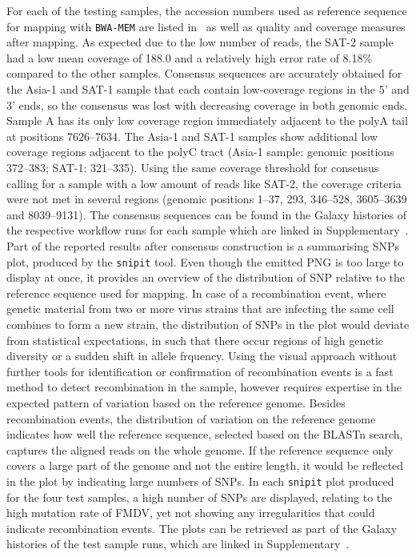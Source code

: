 For each of the testing samples, the accession numbers used as reference sequence for mapping with \texttt{BWA-MEM} are listed in~ as well as quality and coverage measures after mapping. As expected due to the low number of reads, the SAT-2 sample had a low mean coverage of {188.0\texttimes } and a relatively high error rate of 8.18\% compared to the other samples. Consensus sequences are accurately obtained for the Asia-1 and SAT-1 sample that each contain low-coverage regions in the 5' and 3' ends, so the consensus was lost with decreasing coverage in both genomic ends. Sample A has its only low coverage region immediately adjacent to the polyA tail at positions 7626--7634. The Asia-1 and SAT-1 samples show additional low coverage regions adjacent to the polyC tract (Asia-1 sample: genomic positions 372--383; SAT-1: 321--335). Using the same coverage threshold for consensus calling for a sample with a low amount of reads like SAT-2, the coverage criteria were not met in several regions (genomic positions 1--37, 293, 346--528, 3605--3639 and 8039--9131). The consensus sequences can be found in the Galaxy histories of the respective workflow runs for each sample which are linked in Supplementary~. \\
Part of the reported results after consensus construction is a summarising \acp{SNP} plot, produced by the \texttt{snipit} tool. Even though the emitted PNG is too large to display at once, it provides an overview of the distribution of \acs{SNP} relative to the reference sequence used for mapping. In case of a recombination event, where genetic material from two or more virus strains that are infecting the same cell combines to form a new strain, the distribution of \acp{SNP} in the plot would deviate from statistical expectations, in such that there occur regions of high genetic diversity or a sudden shift in allele frquency. Using the visual approach without further tools for identification or confirmation of recombination events is a fast method to detect recombination in the sample, however requires expertise in the expected pattern of variation based on the reference genome. Besides recombination events, the distribution of variation on the reference genome indicates how well the reference sequence, selected based on the \ac{BLAST}n search, captures the aligned reads on the whole genome. If the reference sequence only covers a large part of the genome and not the entire length, it would be reflected in the plot by indicating large numbers of \acp{SNP}. In each \texttt{snipit} plot produced for the four test samples, a high number of \acp{SNP} are displayed, relating to the high mutation rate of \ac{FMDV}, yet not showing any irregularities that could indicate recombination events. The plots can be retrieved as part of the Galaxy histories of the test sample runs, which are linked in Supplementary~.

